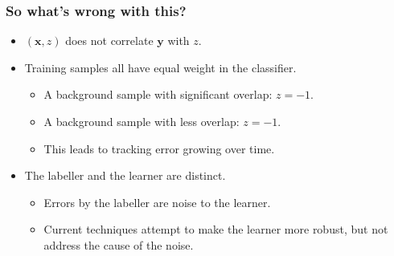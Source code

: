\begin{frame}
    \frametitle{So what's wrong with this?}

    \begin{itemize}
        \item \((\mathbf{x}, z)\) does not correlate \(\mathbf{y}\) with \(z\).
        \item Training samples all have equal weight in the classifier.
            \begin{itemize}
                \item A background sample with significant overlap: \(z = -1\).
                \item A background sample with less overlap: \(z = -1\).
                \item This leads to tracking error growing over time.
            \end{itemize}
        \item The labeller and the learner are distinct.
            \begin{itemize}
                \item Errors by the labeller are noise to the learner.
                \item Current techniques attempt to make the learner more
                    robust, but not address the cause of the noise.
            \end{itemize}
    \end{itemize}
\end{frame}
